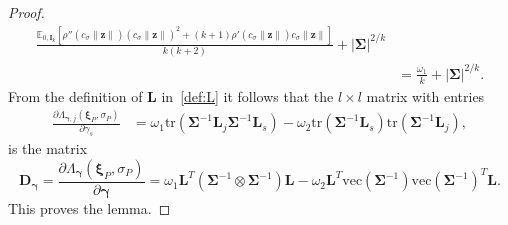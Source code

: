 \documentclass[10pt,a4paper]{amsart}
\newcommand{\bD}{\mathbf{D}}
\newcommand{\bL}{\mathbf{L}}
\newcommand{\bSigma}{\mathbf{\Sigma}}
\newcommand{\bgamma}{\bm\gamma}
\newcommand{\bxi}{\bm\xi}
\newcommand{\bz}{\mathbf{z}}
\newcommand{\vc}{\mathrm{vec}}
\begin{document}
\begin{proof}
\[\begin{split}
\frac{\mathbb{E}_{0,\mathbf{I}_k}
\left[
\rho''(c_\sigma\|\bz\|)(c_\sigma\|\bz\|)^2+(k+1)\rho'(c_\sigma\|\bz\|)c_\sigma\|\bz\|
\right]}{k(k+2)}
+
|\bSigma|^{2/k}\\
&=
\frac{\omega_1}{k}+|\bSigma|^{2/k}.
\end{split}
\]
From the definition of $\bL$ in~\eqref{def:L} it follows that the $l\times l$ matrix with entries
\[
\begin{split}
\frac{\partial\Lambda_{\bgamma,j}(\bxi_P,\sigma_P)}{\partial \gamma_s}
&=
\omega_1\text{tr}(\bSigma^{-1}\bL_j\bSigma^{-1}\bL_s)
-
\omega_2\text{tr}(\bSigma^{-1}\bL_s)\text{tr}(\bSigma^{-1}\bL_j),
\end{split}
\]
is the matrix
\[
\bD_{\bgamma}
=
\frac{\partial\Lambda_{\bgamma}(\bxi_P,\sigma_P)}{\partial \bgamma}
=
\omega_1\mathbf{L}^T\left(\bSigma^{-1}\otimes\bSigma^{-1}\right)\mathbf{L}
-
\omega_2\mathbf{L}^T
\vc(\bSigma^{-1})
\vc(\bSigma^{-1})^T
\mathbf{L}.
\]
This proves the lemma.
\end{proof}
\end{document}

